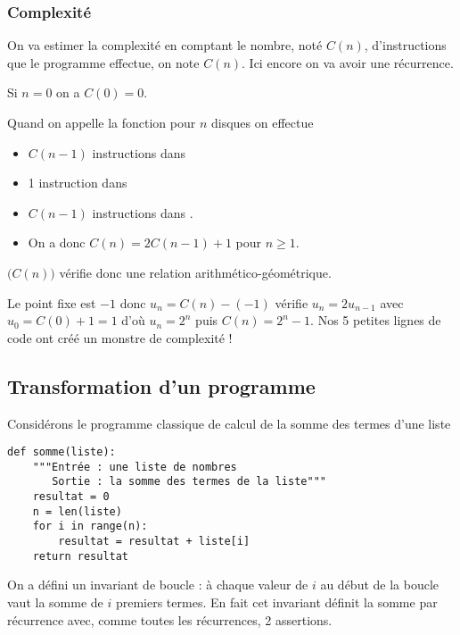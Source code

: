 \subsubsection{Complexité}

On va estimer la complexité en comptant le nombre, noté $C(n)$, d'instructions  que le programme effectue, on note $C(n)$.
Ici encore on va avoir une récurrence. 

Si $n=0$ on a $C(0)=0$. 

Quand on appelle la fonction pour $n$ disques on effectue
\begin{itemize}
  \item $C(n-1)$ instructions  dans 
  
  \item 1 instruction  dans 

  \item $C(n-1)$ instructions  dans .
  
  \item On a donc $C(n)=2C(n-1)+1$ pour $n\ge 1$.
\end{itemize}
$\bigl(C(n)\bigr)$ vérifie donc une relation arithmético-géométrique. 

Le point fixe est $-1$ donc $u_n=C(n)-(-1)$ vérifie $u_n=2u_{n-1}$ avec $u_0=C(0)+1=1$ d'où $u_n=2^n$ puis $C(n)=2^n-1$.
Nos 5 petites lignes de code ont créé un monstre de complexité !
\subsection{Transformation d'un programme}
Considérons le programme classique de calcul de la somme des termes d'une liste
\begin{lstlisting}
def somme(liste):
    """Entrée : une liste de nombres
       Sortie : la somme des termes de la liste"""
    resultat = 0
    n = len(liste)
    for i in range(n):
        resultat = resultat + liste[i]
    return resultat
\end{lstlisting}
On a défini un invariant de boucle : à chaque valeur de $i$ au début de la boucle  vaut la somme de $i$ premiers termes. En fait cet invariant définit la somme par récurrence avec, comme toutes les récurrences, 2 assertions.

